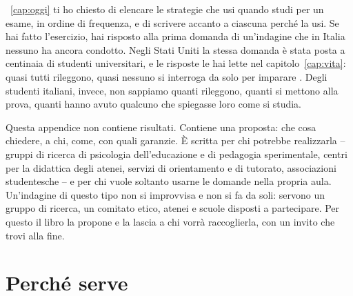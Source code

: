 \newcommand{\quadretto}{\tikz[baseline=-0.05em]\draw[line width=0.4pt]
  (0,0) rectangle (0.62em,0.62em);}
\newcommand{\rigavuota}{\rule{0pt}{1.6\baselineskip}}
\newcommand{\domanda}[1]{\par\medskip
  \begingroup\dimen0=\pagegoal\advance\dimen0 by -\pagetotal
  \ifdim\dimen0<6\baselineskip\newpage\fi\endgroup
  \noindent\textbf{#1}\enspace}
\newenvironment{opzioni}
  {\begin{itemize}[label=\quadretto, leftmargin=1.6em, itemsep=0pt, topsep=0.2\baselineskip]}
  {\end{itemize}}

~\ref{cap:oggi} ti ho chiesto di elencare le
strategie che usi quando studi per un esame, in ordine di frequenza, e
di scrivere accanto a ciascuna perché la usi. Se hai fatto l'esercizio,
hai risposto alla prima domanda di un'indagine che in Italia nessuno ha
ancora condotto. Negli Stati Uniti la stessa domanda è stata posta a
centinaia di studenti universitari, e le risposte le hai lette nel
capitolo~\ref{cap:vita}: quasi tutti rileggono, quasi nessuno si
interroga da solo per imparare \parencite{karpicke2009}. Degli
studenti italiani, invece, non sappiamo quanti rileggono, quanti si
mettono alla prova, quanti hanno avuto qualcuno che spiegasse loro come
si studia.

Questa appendice non contiene risultati. Contiene una proposta: che
cosa chiedere, a chi, come, con quali garanzie. È scritta per chi
potrebbe realizzarla -- gruppi di ricerca di psicologia dell'educazione
e di pedagogia sperimentale, centri per la didattica degli atenei,
servizi di orientamento e di tutorato, associazioni studentesche -- e
per chi vuole soltanto usarne le domande nella propria aula. Un'indagine
di questo tipo non si improvvisa e non si fa da soli: servono un gruppo
di ricerca, un comitato etico, atenei e scuole disposti a partecipare.
Per questo il libro la propone e la lascia a chi vorrà raccoglierla,
con un invito che trovi alla fine.

\section{Perché serve}

